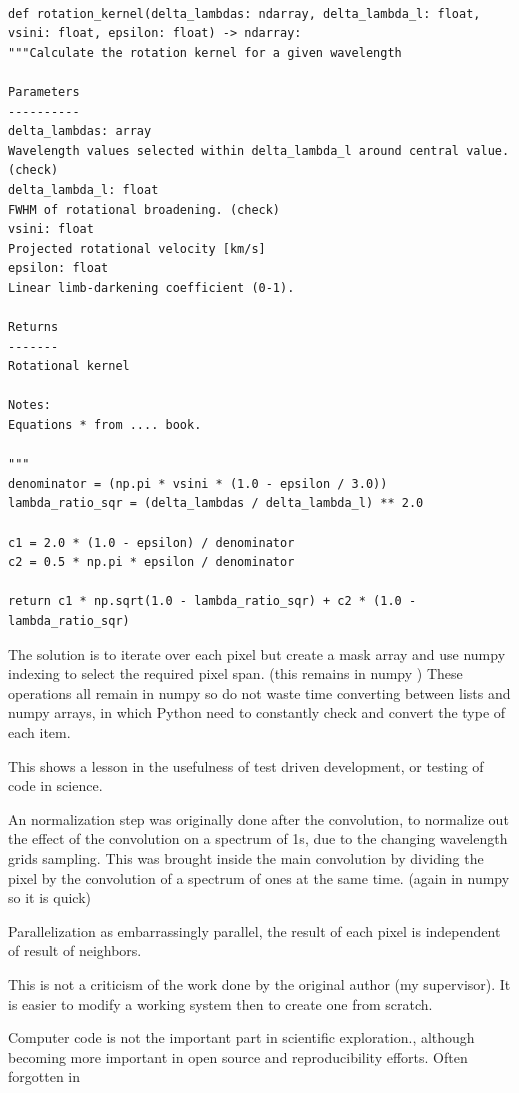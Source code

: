 \begin{lstlisting}

def rotation_kernel(delta_lambdas: ndarray, delta_lambda_l: float, vsini: float, epsilon: float) -> ndarray:
"""Calculate the rotation kernel for a given wavelength

Parameters
----------
delta_lambdas: array
Wavelength values selected within delta_lambda_l around central value. (check)
delta_lambda_l: float
FWHM of rotational broadening. (check)
vsini: float
Projected rotational velocity [km/s]
epsilon: float
Linear limb-darkening coefficient (0-1).

Returns
-------
Rotational kernel

Notes:
Equations * from .... book.

"""
denominator = (np.pi * vsini * (1.0 - epsilon / 3.0))
lambda_ratio_sqr = (delta_lambdas / delta_lambda_l) ** 2.0

c1 = 2.0 * (1.0 - epsilon) / denominator
c2 = 0.5 * np.pi * epsilon / denominator

return c1 * np.sqrt(1.0 - lambda_ratio_sqr) + c2 * (1.0 - lambda_ratio_sqr)
\end{lstlisting}

The solution is to iterate over each pixel but create a mask array and use numpy indexing to select the required pixel span. (this remains in numpy ) 
These operations all remain in numpy so do not waste time converting between lists and numpy arrays, in which Python need to constantly check and convert the type of each item.

This shows a lesson in the usefulness of test driven development, or testing of code in science.


An normalization step was originally done after the convolution, to normalize out the effect of the convolution on a spectrum of 1s, due to the changing wavelength grids sampling. This was brought inside the main convolution by dividing the pixel by the convolution of a spectrum of ones at the same time. (again in numpy so it is quick)

Parallelization as embarrassingly parallel, the result of each pixel is independent of result of neighbors.

This is not a criticism of the work done by the original author (my supervisor). It is easier to modify a working system then to create one from scratch.

Computer code is not the important part in scientific exploration., although becoming more important in open source and reproducibility efforts. Often forgotten in 


